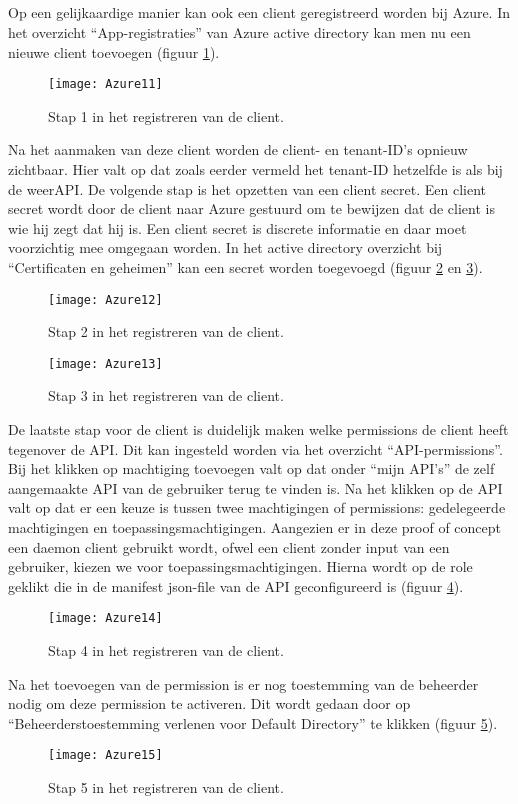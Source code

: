\subsection{}
Op een gelijkaardige manier kan ook een client geregistreerd worden bij Azure. In het overzicht “App-registraties” van Azure active directory kan men nu een nieuwe client toevoegen (figuur \ref{fig:azure11}).
\begin{figure}[H]
	\centering
	\texttt{[image: Azure11]} 
	\caption[Azure11]{Stap 1 in het registreren van de client.}
	\label{fig:azure11}
\end{figure}
Na het aanmaken van deze client worden de client- en tenant-ID’s opnieuw zichtbaar. Hier valt op dat zoals eerder vermeld het tenant-ID hetzelfde is als bij de weerAPI. De volgende stap is het opzetten van een client secret. Een client secret wordt door de client naar Azure gestuurd om te bewijzen dat de client is wie hij zegt dat hij is. Een client secret is discrete informatie en daar moet voorzichtig mee omgegaan worden. In het active directory overzicht bij “Certificaten en geheimen” kan een secret worden toegevoegd (figuur \ref{fig:azure12} en \ref{fig:azure13}). 
\begin{figure}[H]
	\centering
	\texttt{[image: Azure12]} 
	\caption[Azure12]{Stap 2 in het registreren van de client.}
	\label{fig:azure12}
\end{figure}
\begin{figure}[H]
	\centering
	\texttt{[image: Azure13]} 
	\caption[Azure13]{Stap 3 in het registreren van de client.}
	\label{fig:azure13}
\end{figure}
De laatste stap voor de client is duidelijk maken welke permissions de client heeft tegenover de API. Dit kan ingesteld worden via het overzicht “API-permissions”. Bij het klikken op machtiging toevoegen valt op dat onder “mijn API’s” de zelf aangemaakte API van de gebruiker terug te vinden is. Na het klikken op de API valt op dat er een keuze is tussen twee machtigingen of permissions: gedelegeerde machtigingen en toepassingsmachtigingen. Aangezien er in deze proof of concept een daemon client gebruikt wordt, ofwel een client zonder input van een gebruiker, kiezen we voor toepassingsmachtigingen. Hierna wordt op de role geklikt die in de manifest json-file van de API geconfigureerd is (figuur \ref{fig:azure14}). 
\begin{figure}[H]
	\centering
	\texttt{[image: Azure14]} 
	\caption[Azure14]{Stap 4 in het registreren van de client.}
	\label{fig:azure14}
\end{figure}
Na het toevoegen van de permission is er nog toestemming van de beheerder nodig om deze permission te activeren. Dit wordt gedaan door op “Beheerderstoestemming verlenen voor Default Directory” te klikken (figuur \ref{fig:azure15}).
\begin{figure}[H]
	\centering
	\texttt{[image: Azure15]} 
	\caption[Azure15]{Stap 5 in het registreren van de client.}
	\label{fig:azure15}
\end{figure}
